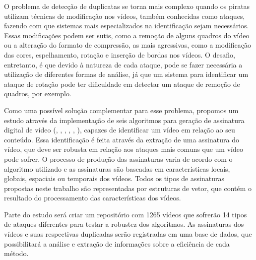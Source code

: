 
O problema de detecção de duplicatas se torna mais complexo quando os piratas utilizam técnicas de modificação nos vídeos, também conhecidas como ataques, fazendo com que sistemas mais especializados na identificação sejam necessários. Essas modificações podem ser sutis, como a remoção de alguns quadros do vídeo ou a alteração do formato de compressão, as mais agressivas, como a modificação das cores, espelhamento, rotação e inserção de bordas nos vídeos. O desafio, entretanto, é que devido à natureza de cada ataque, pode se fazer necessária a utilização de diferentes formas de análise, já que um sistema para identificar um ataque de rotação pode ter dificuldade em detectar um ataque de remoção de quadros, por exemplo. 

Como uma possível solução complementar para esse problema, propomos um estudo através da implementação de seis algoritmos para geração de assinatura digital de vídeo (\citeauthor{hua2004robust}, \citeauthor{lee2008robust}, \citeauthor{cook2011efficient}, \citeauthor{mao2015sceneframe}, \citeauthor{kim2014rotation}, \citeauthor{Dutta2013}), capazes de identificar um vídeo em relação ao seu conteúdo. Essa identificação é feita através da extração de uma assinatura do vídeo, que deve ser robusta em relação aos ataques mais comuns que um vídeo pode sofrer. O processo de produção das assinaturas varia de acordo com o algoritmo utilizado e as assinaturas são baseadas em características locais, globais, espaciais ou temporais dos vídeos. Todos os tipos de assinaturas propostas neste trabalho são representadas por estruturas de vetor, que contém o resultado do processamento das características dos vídeos.

Parte do estudo será criar um repositório com 1265 vídeos que sofrerão 14 tipos de ataques diferentes para testar a robustez dos algoritmos. As assinaturas dos vídeos e suas respectivas duplicadas serão registradas em  uma base de dados, que possibilitará a análise e extração de informações sobre a eficiência de cada método.


